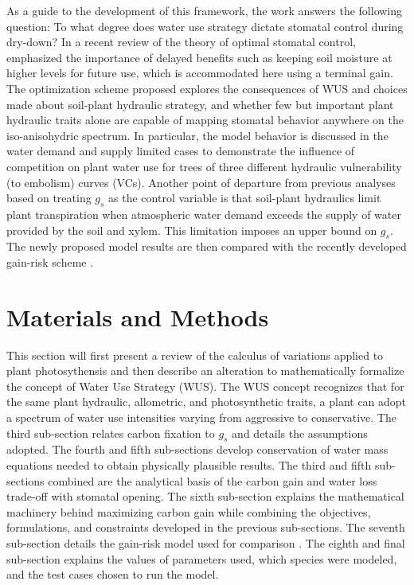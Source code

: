 \documentclass[utf8]{frontiersSCNS} %
\begin{document}
As a guide to the development of this framework, the work answers the following question: To what degree does water use strategy dictate stomatal control during dry-down? In a recent review of the theory of optimal stomatal control, \citet{buckley_optimal_2017} emphasized the importance of delayed benefits such as keeping soil moisture at higher levels for future use, which is accommodated here using a terminal gain. The optimization scheme proposed explores the consequences of WUS and choices made about soil-plant hydraulic strategy, and whether few but important plant hydraulic traits alone are capable of mapping stomatal behavior anywhere on the iso-anisohydric spectrum. In particular, the model behavior is discussed in the water demand and supply limited cases to demonstrate the influence of competition on plant water use for trees of three different hydraulic vulnerability (to embolism)  curves (VCs). Another point of departure from previous analyses based on treating $g_s$ as the control variable is that soil-plant hydraulics limit plant transpiration when atmospheric water demand exceeds the supply of water provided by the soil and xylem. This limitation imposes an upper bound on $g_s$. The newly proposed model results are then compared with the recently developed gain-risk scheme \citep{venturas_2018}. 

\section{Materials and Methods}

This section will first present a review of the calculus of variations applied to plant photosythensis and then describe an alteration to mathematically formalize the concept of Water Use Strategy (WUS). The WUS concept recognizes that for the same plant hydraulic, allometric, and photosynthetic traits, a plant can adopt a spectrum of water use intensities varying from aggressive to conservative. The third sub-section relates carbon fixation to $g_s$ and details the assumptions adopted. The fourth and fifth sub-sections develop conservation of water mass equations needed to obtain physically plausible results. The third and fifth sub-sections combined are the analytical basis of the carbon gain and water loss trade-off with stomatal opening. The sixth sub-section explains the mathematical machinery behind maximizing carbon gain while combining the objectives, formulations, and constraints developed in the previous sub-sections. The seventh sub-section details the gain-risk model used for comparison \citep{sperry_what_2015,sperry_pragmatic_2016}. The eighth and final sub-section explains the values of parameters used, which species were modeled, and the test cases chosen to run the model.
\end{document}
